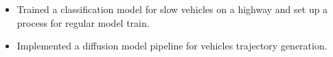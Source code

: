 \begin{itemize}
    \item Trained a classification model for slow vehicles on a highway and set up a process for regular model train.
    \item Implemented a diffusion model pipeline for vehicles trajectory generation.
\end{itemize}
